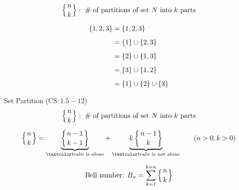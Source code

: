
\begin{frame}{}
  \[
    \left\{ n \atop k \right\}: \text{ \# of partitions of set $N$ into $k$ parts}
  \]

  \begin{align*}
    \{1, 2, 3\} &= \{1, 2, 3\} \\[5pt]
                  &= \{1\} \cup \{2, 3\}  \\[5pt]
                  &= \{2\} \cup \{1, 3\}  \\[5pt]
                  &= \{3\} \cup \{1, 2\}  \\[5pt]
                  &= \{1\} \cup \{2\} \cup \{3\}
  \end{align*}

  \pause
  \begin{center}
  \end{center}
\end{frame}

\begin{frame}{}
  \begin{exampleblock}{Set Partition ($\text{CS}: 1.5-12$)}
    \[
      \left\{ n \atop k \right\}: \text{ \# of partitions of set $N$ into $k$ parts}
    \]
  \end{exampleblock}

  \pause
  \vspace{0.60cm}
  \[
    \setpartition{n}{k} = \underbrace{\setpartition{n-1}{k-1}}_{\text{\teal{$n$ is alone}}} 
      + \underbrace{k \setpartition{n-1}{k}}_{\text{\teal{$n$ is not alone}}} \qquad (n > 0, k > 0)
  \]

  \pause
  \vspace{0.50cm}
  \[
    \text{Bell number: } B_n = \sum_{k=1}^{k=n} \left\{ n \atop k \right\}
  \]
\end{frame}

% 
% 
